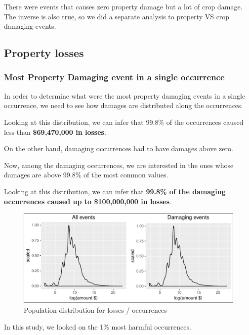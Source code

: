\documentclass[]{article}
\begin{document}
There were events that causes zero property damage but a lot of crop
damage. The inverse is also true, so we did a separate analysis to
property VS crop damaging events.

\subsection{Property losses}\label{property-losses}

\subsubsection{Most Property Damaging event in a single
occurrence}\label{most-property-damaging-event-in-a-single-occurrence}

In order to determine what were the most property damaging events in a
single occurrence, we need to see how damages are distributed along the
occurrences.

Looking at this distribution, we can infer that 99.8\% of the
occurrences caused less than \textbf{\$69,470,000 in losses}.

On the other hand, damaging occurrences had to have damages above zero.

Now, among the damaging occurrences, we are interested in the ones whose
damages are above 99.8\% of the most common values.

Looking at this distribution, we can infer that \textbf{99.8\% of the
damaging occurrences caused up to \$100,000,000 in losses}.

\begin{figure}[htbp]
\centering
\includegraphics{readme_files/figure-latex/crop-distribution-1.pdf}
\caption{Population distribution for losses / occurrences}
\end{figure}

In this study, we looked on the 1\% most harmful occurrences.
\end{document}
